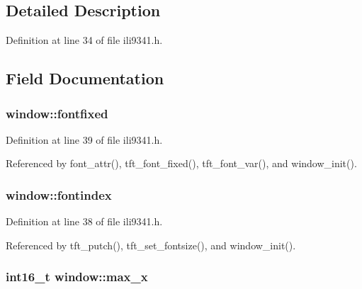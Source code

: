 \subsection{Detailed Description}


Definition at line 34 of file ili9341.\-h.



\subsection{Field Documentation}
\hypertarget{structwindow_a5afd09eaf1e9c22fa611f0f529177ac9}{
\subsubsection[{fontfixed}]{ window\-::fontfixed}}\label{structwindow_a5afd09eaf1e9c22fa611f0f529177ac9}


Definition at line 39 of file ili9341.\-h.



Referenced by font\-\_\-attr(), tft\-\_\-font\-\_\-fixed(), tft\-\_\-font\-\_\-var(), and window\-\_\-init().

\hypertarget{structwindow_a00da6dceaca10739712164daaa08a2dd}{
\subsubsection[{fontindex}]{ window\-::fontindex}}\label{structwindow_a00da6dceaca10739712164daaa08a2dd}


Definition at line 38 of file ili9341.\-h.



Referenced by tft\-\_\-putch(), tft\-\_\-set\-\_\-fontsize(), and window\-\_\-init().

\hypertarget{structwindow_affe3812cbf97934375f43e82fdd76166}{
\subsubsection[{max\-\_\-x}]{\setlength{\rightskip}{0pt plus 5cm}int16\-\_\-t window\-::max\-\_\-x}}\label{structwindow_affe3812cbf97934375f43e82fdd76166}


